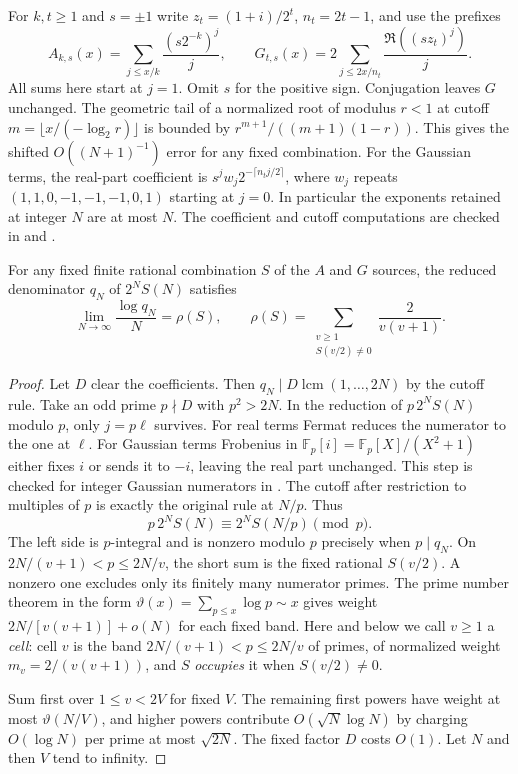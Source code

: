 \documentclass[11pt]{article}
\DeclareMathOperator{\lcm}{lcm}
\newcommand{\F}{\mathbb F}
\begin{document}
For $k,t\ge1$ and $s=\pm1$ write $z_t=(1+i)/2^t$, $n_t=2t-1$, and use the prefixes
\[
 A_{k,s}(x)=\sum_{j\le x/k}\frac{(s2^{-k})^j}{j},\qquad
 G_{t,s}(x)=2\sum_{j\le 2x/n_t}\frac{\Re((s z_t)^j)}{j}.
\]
All sums here start at $j=1$. Omit $s$ for the positive sign. Conjugation leaves $G$ unchanged. The geometric tail of a normalized root of modulus $r<1$ at cutoff $m=\lfloor x/(-\log_2 r)\rfloor$ is bounded by $r^{m+1}/((m+1)(1-r))$. This gives the shifted $O((N+1)^{-1})$ error for any fixed combination. For the Gaussian terms, the real-part coefficient is $s^jw_j2^{-\lceil n_tj/2\rceil}$, where $w_j$ repeats $(1,1,0,-1,-1,-1,0,1)$ starting at $j=0$. In particular the exponents retained at integer $N$ are at most $N$. The coefficient and cutoff computations are checked in
 and
.

\begin{proposition}\label{prop:bands}
For any fixed finite rational combination $S$ of the $A$ and $G$ sources, the reduced denominator $q_N$ of $2^NS(N)$ satisfies
\[
 \lim_{N\to\infty}\frac{\log q_N}{N}=\rho(S),\qquad
 \rho(S)=\sum_{\substack{v\ge1\\S(v/2)\ne0}}\frac{2}{v(v+1)} .
\]
\end{proposition}
\begin{proof}
Let $D$ clear the coefficients. Then $q_N\mid D\lcm(1,\ldots,2N)$ by the cutoff rule. Take an odd prime $p\nmid D$ with $p^2>2N$. In the reduction of $p\,2^NS(N)$ modulo $p$, only $j=p\ell$ survives. For real terms Fermat reduces the numerator to the one at $\ell$. For Gaussian terms Frobenius in $\F_p[i]=\F_p[X]/(X^2+1)$ either fixes $i$ or sends it to $-i$, leaving the real part unchanged. This step is checked for integer Gaussian numerators in . The cutoff after restriction to multiples of $p$ is exactly the original rule at $N/p$. Thus
\[
 p\,2^NS(N)\equiv 2^NS(N/p)\pmod p .
\]
The left side is $p$-integral and is nonzero modulo $p$ precisely when $p\mid q_N$. On $2N/(v+1)<p\le2N/v$, the short sum is the fixed rational $S(v/2)$. A nonzero one excludes only its finitely many numerator primes. The prime number theorem in the form $\vartheta(x)=\sum_{p\le x}\log p\sim x$ \cite[\S19, p.~219, modulus $1$]{hadamard} gives weight $2N/[v(v+1)]+o(N)$ for each fixed band. Here and below we call $v\ge1$ a \emph{cell}: cell $v$ is the band $2N/(v+1)<p\le2N/v$ of primes, of normalized weight $m_v=2/(v(v+1))$, and $S$ \emph{occupies} it when $S(v/2)\ne0$.

Sum first over $1\le v<2V$ for fixed $V$. The remaining first powers have weight at most $\vartheta(N/V)$, and higher powers contribute $O(\sqrt N\log N)$ by charging $O(\log N)$ per prime at most $\sqrt{2N}$. The fixed factor $D$ costs $O(1)$. Let $N$ and then $V$ tend to infinity.
\end{proof}
\end{document}
